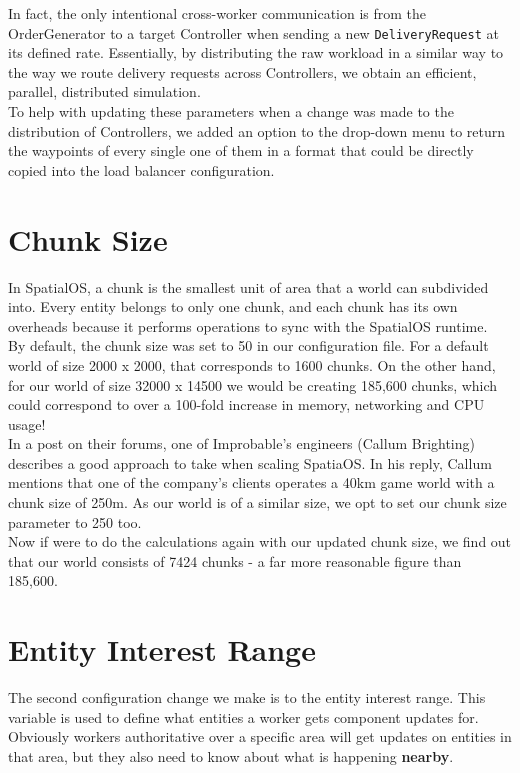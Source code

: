 \documentclass[a4paper,11pt,titlepage]{report}
\begin{document}
In fact, the only intentional cross-worker communication is from the OrderGenerator to a target Controller when sending a new \texttt{DeliveryRequest} at its defined rate. Essentially, by distributing the raw workload in a similar way to the way we route delivery requests across Controllers, we obtain an efficient, parallel, distributed simulation.\\

To help with updating these parameters when a change was made to the distribution of Controllers, we added an option to the drop-down menu to return the waypoints of every single one of them in a format that could be directly copied into the load balancer configuration.

\clearpage
\section{Chunk Size}
In SpatialOS, a chunk is the smallest unit of area that a world can subdivided into. Every entity belongs to only one chunk, and each chunk has its own overheads because it performs operations to sync with the SpatialOS runtime.\\

By default, the chunk size was set to 50 in our configuration file. For a default world of size 2000 x 2000, that corresponds to 1600 chunks. On the other hand, for our world of size 32000 x 14500 we would be creating 185,600 chunks, which could correspond to over a 100-fold increase in memory, networking and CPU usage!\\

In a post on their forums, one of Improbable's engineers (Callum Brighting) describes a good approach to take when scaling SpatiaOS\cite{Brighting}. In his reply, Callum mentions that one of the company's clients operates a 40km game world with a chunk size of 250m. As our world is of a similar size, we opt to set our chunk size parameter to 250 too.\\

Now if were to do the calculations again with our updated chunk size, we find out that our world consists of 7424 chunks - a far more reasonable figure than 185,600.

\section{Entity Interest Range}
The second configuration change we make is to the entity interest range. This variable is used to define what entities a worker gets component updates for. Obviously workers authoritative over a specific area will get updates on entities in that area, but they also need to know about what is happening \textbf{nearby}.\\
\end{document}
